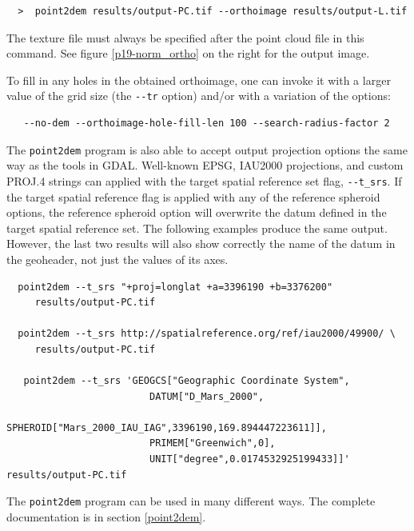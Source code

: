 \begin{verbatim}
  >  point2dem results/output-PC.tif --orthoimage results/output-L.tif
\end{verbatim}

The texture file must always be specified after the point cloud file in
this command. See figure \ref{p19-norm_ortho} on the right for the
output image.

To fill in any holes in the obtained orthoimage, one can invoke it
with a larger value of the grid size (the \texttt{-\/-tr} option)
and/or with a variation of the options:

\begin{verbatim}
   --no-dem --orthoimage-hole-fill-len 100 --search-radius-factor 2 
\end{verbatim}

The \texttt{point2dem} program is also able to accept output
projection options the same way as the tools in GDAL. Well-known EPSG,
IAU2000 projections, and custom PROJ.4 strings can applied with the
target spatial reference set flag, \texttt{-\/-t\_srs}. If the target
spatial reference flag is applied with any of the reference spheroid
options, the reference spheroid option will overwrite the datum
defined in the target spatial reference set. The following examples
produce the same output. However, the last two results will also 
show correctly the name of the datum in the geoheader, not just the values
of its axes.

\begin {verbatim}
  point2dem --t_srs "+proj=longlat +a=3396190 +b=3376200"
     results/output-PC.tif

  point2dem --t_srs http://spatialreference.org/ref/iau2000/49900/ \
     results/output-PC.tif

   point2dem --t_srs 'GEOGCS["Geographic Coordinate System",                     
                         DATUM["D_Mars_2000",
                         SPHEROID["Mars_2000_IAU_IAG",3396190,169.894447223611]],
                         PRIMEM["Greenwich",0],
                         UNIT["degree",0.0174532925199433]]' results/output-PC.tif
\end{verbatim}

The \texttt{point2dem} program can be used in many different ways. The
complete documentation is in section \ref{point2dem}.

